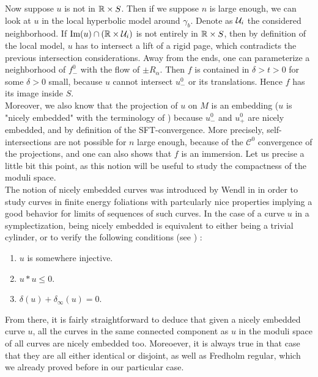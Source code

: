 \documentclass[../main.tex]{subfiles}
\begin{document}
Now suppose $u$ is not in $\mathbb{R}\times S$. Then if we suppose $n$ is large enough, we can look at $u$ in the local hyperbolic model around $\gamma_b$. Denote as $\mathcal{U}_i$ the considered neighborhood. If $\text{Im}(u)\cap (\mathbb{R}\times \mathcal{U}_i) $ is not entirely in $\mathbb{R}\times S$, then by definition of the local model, $u$ has to intersect a lift of a rigid page, which contradicts the previous intersection considerations. Away from the ends, one can parameterize a neighborhood of $f_-^0$ with the flow of $\pm R_\alpha$. Then $f$ is contained in $\delta > t > 0$ for some $\delta > 0$ small, because $u$ cannot intersect $u_-^0$ or its translations. Hence $f$ has its image inside $S$.\\

Moreover, we also know that the projection of $u$ on $M$ is an embedding ($u$ is "nicely embedded" with the terminology of \cite{wendl_automatic_2009}) because $u_-^0$ and $u_+^0$ are nicely embedded, and by definition of the SFT-convergence. More precisely, self-intersections are not possible for $n$ large enough, because of the $\mathcal{C}^0$ convergence of the projections, and one can also shows that $f$ is an immersion. Let us precise a little bit this point, as this notion will be useful to study the compactness of the moduli space.\\

The notion of nicely embedded curves was introduced by Wendl in \cite{wendl_automatic_2009} in order to study curves in finite energy foliations with partcularly nice properties implying a good behavior for limits of sequences of such curves. In the case of a curve $u$ in a symplectization, being nicely embedded is equivalent to either being a trivial cylinder, or to verify the following conditions (see \cite{cioba_nicely_nodate}) :

\begin{enumerate}
    \item $u$ is somewhere injective.
    \item $u*u\leq 0$.
    \item $\delta(u)+\delta_\infty(u) = 0$.
\end{enumerate}

From there, it is fairly straightforward to deduce that given a nicely embedded curve $u$, all the curves in the same connected component as $u$ in the moduli space of all curves are nicely embedded too. Moreoever, it is always true in that case that they are all either identical or disjoint, as well as Fredholm regular, which we already proved before in our particular case.\\
\end{document}
